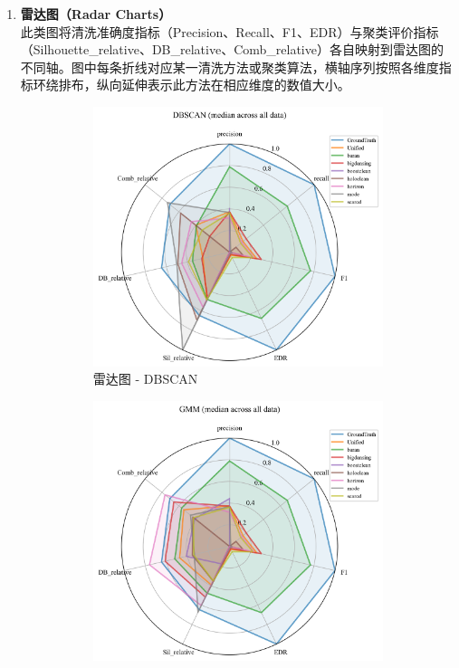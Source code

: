 \documentclass[10pt]{article} %
\numberwithin{equation}{section}
\begin{document}
\begin{enumerate}[label=(\alph*)]
    \item \textbf{雷达图（Radar Charts）} \\
    此类图将清洗准确度指标（Precision、Recall、F1、EDR）与聚类评价指标（Silhouette\_relative、DB\_relative、Comb\_relative）各自映射到雷达图的不同轴。图中每条折线对应某一清洗方法或聚类算法，横轴序列按照各维度指标环绕排布，纵向延伸表示此方法在相应维度的数值大小。
\begin{figure}[htbp]
    \centering
    \begin{subfigure}[b]{0.30\linewidth}
        \centering
        \includegraphics[width=\linewidth]{figures/radar graph/radar_DBSCAN.png}
        \caption{雷达图 - DBSCAN}
        \label{fig:radar_dbscan}
    \end{subfigure}
    \hfill
    \begin{subfigure}[b]{0.30\linewidth}
        \centering
        \includegraphics[width=\linewidth]{figures/radar graph/radar_GMM.png}

\end{subfigure}
\end{figure}
\end{enumerate}
\end{document}
